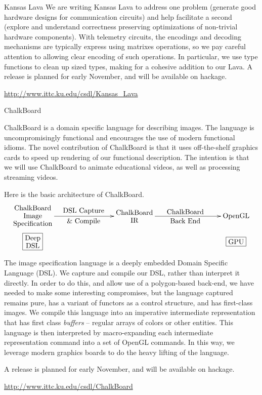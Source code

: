 \documentclass{scrreprt}
\begin{document}
\begin{hcarentry}{Kansas Lava}
We are writing Kansas Lava to address one problem (generate good hardware designs for communication circuits)
and help facilitate a second (explore and understand correctness preserving optimizations of non-trivial
hardware components).
With telemetry circuits, the encodings and decoding mechanisms
are typically express using matrixes operations, so we pay careful
attention to allowing clear encoding of such operations.
In particular, we use type functions to clean up sized types, 
making for a cohesive addition to our Lava.
A release is planned for early November, and will be available on hackage.

\FurtherReading
  \url{http://www.ittc.ku.edu/csdl/Kansas_Lava}
\end{hcarentry}

\begin{hcarentry}{ChalkBoard}
\makeheader

ChalkBoard is a domain specific language for describing images. 
The language is uncompromisingly functional
and encourages the use of modern functional idioms.
The novel contribution of ChalkBoard is that it uses off-the-shelf
graphics cards to speed up rendering of our functional description.
The intention is that we will use ChalkBoard to animate educational
videos, as well as processing streaming videos.

Here is the basic architecture of ChalkBoard. 
{\small
\[
\xygraph{
!{(-4,0)}{\txt{ChalkBoard\\Image\\Specification}}="CIS",
!{(-4,-1)}*+[F]{\txt{Deep\\DSL}},
!{(0,0)}*+{\txt{ChalkBoard\\IR}}="CBIR",
!{(4,0)}{\txt{OpenGL}}="OpenGL",
!{(4,-1)}*+[F]{\txt{GPU}},
"CIS" :@{->}^{\txt{DSL Capture}}_{\txt{\& Compile}} "CBIR",
"CBIR" :@{->}^{\txt{ChalkBoard}}_{\txt{Back End}} "OpenGL",
!{}
}
\]
}

The image specification language is a deeply embedded Domain Specific Language (DSL).
We capture and compile our DSL, rather than interpret it directly. 
In order to do this, and allow use of a polygon-based back-end,
we have needed to make some interesting compromises,
but the language captured remains pure, has a variant
of functors as a control structure,
and has first-class images.
We compile this language into an imperative intermediate representation
that has first class {\em buffers} -- regular arrays of colors or other entities.
This language is then interpreted by macro-expanding each intermediate representation
command into a set of OpenGL commands.  In this
way, we leverage modern  graphics boards to
do the heavy lifting of the language. 

A release is planned for early November, and will be available on hackage.

\FurtherReading
  \url{http://www.ittc.ku.edu/csdl/ChalkBoard}
\end{hcarentry}
\end{document}
